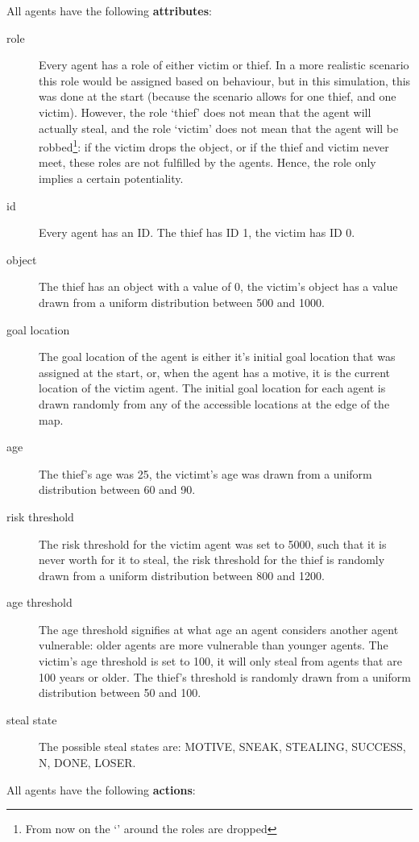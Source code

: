 \documentclass[12pt]{article}
\begin{document}
All agents have the following \textbf{attributes}:
\begin{description}
\item [role] Every agent has a role of either victim or thief. In a more realistic scenario this role would be assigned based on behaviour, but in this simulation, this was done at the start (because the scenario allows for one thief, and one victim). However, the role `thief' does not mean that the agent will actually steal, and the role `victim' does not mean that the agent will be robbed\footnote{From now on the `' around the roles are dropped}: if the victim drops the object, or if the thief and victim never meet, these roles are not fulfilled by the agents. Hence, the role only implies a certain potentiality.
\item [id] Every agent has an ID. The thief has ID 1, the victim has ID 0.
\item [object] The thief has an object with a value of 0, the victim's object has a value drawn from a uniform distribution between 500 and 1000. 
\item [goal location] The goal location of the agent is either it's initial goal location that was assigned at the start, or, when the agent has a motive, it is the current location of the victim agent. The initial goal location for each agent is drawn randomly from any of the accessible locations at the edge of the map.
\item [age] The thief's age was 25, the victimt's age was drawn from a uniform distribution between 60 and 90.
\item [risk threshold] The risk threshold for the victim agent was set to 5000, such that it is never worth for it to steal, the risk threshold for the thief is randomly drawn from a uniform distribution between 800 and 1200.
\item [age threshold] The age threshold signifies at what age an agent considers another agent vulnerable: older agents are more vulnerable than younger agents. The victim's age threshold is set to 100, it will only steal from agents that are 100 years or older. The thief's threshold is randomly drawn from a uniform distribution between 50 and 100.
\item [steal state] The possible steal states are: MOTIVE, SNEAK, STEALING, SUCCESS, N, DONE, LOSER.
\end{description}

All agents have the following \textbf{actions}:
\end{document}
